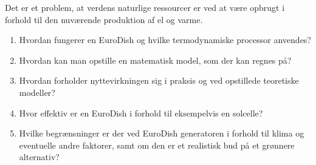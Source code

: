\documentclass[SRC.tex]{subfiles}
\begin{document}
	Det er et problem, at verdens naturlige ressourcer er ved at være opbrugt i forhold til den nuværende produktion af el og varme.  
	\begin{enumerate}[-]
		\item Hvordan fungerer en EuroDish og hvilke termodynamiske processor anvendes?
		\item Hvordan kan man opstille en matematisk model, som der kan regnes på?
		\item Hvordan forholder nyttevirkningen sig i praksis og ved opstillede teoretiske modeller?
		\item Hvor effektiv er en EuroDish i forhold til eksempelvis en solcelle?
		\item Hvilke begrænsninger er der ved  EuroDish generatoren i forhold til klima og eventuelle andre faktorer, samt om den er et realistisk bud på et grønnere alternativ? 
	\end{enumerate} 
\end{document}
